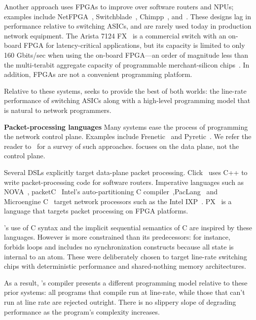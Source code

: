 Another approach uses FPGAs to improve over software routers and NPUs; examples
include NetFPGA~\cite{netfpga}, Switchblade~\cite{switchblade}, Chimpp~\cite{chimpp},
and~\cite{silver_bullet}. These designs lag in performance relative to switching
ASICs, and are rarely used today in production network equipment. The Arista
7124 FX~\cite{7124fx} is a commercial switch with an on-board FPGA for
latency-critical applications, but its capacity is limited to only 160
Gbits/sec when using the on-board FPGA---an order of magnitude less than the
multi-terabit aggregate capacity of programmable merchant-silicon
chips~\cite{xpliant}. In addition, FPGAs are not a convenient programming
platform.

Relative to these systems, \pktlanguage seeks to provide the best of both
worlds: the line-rate performance of switching ASICs along with a high-level
programming model that is natural to network programmers.

\textbf{Packet-processing languages}
Many systems ease the process of programming the network control plane.
Examples include Frenetic~\cite{frenetic} and Pyretic~\cite{pyretic}. We refer
the reader to~\cite{language_survey} for a survey of such approaches.
\pktlanguage focuses on the data plane, not the control plane.

Several DSLs explicitly target data-plane packet processing. Click~\cite{click} uses C++
to write packet-processing code for software routers. Imperative languages such
as NOVA~\cite{nova}, packetC~\cite{packetc} Intel's auto-partitioning C
compiler~\cite{intel_uiuc_pldi},PacLang~\cite{paclang_lang,
paclang_partitioner} and Microengine C~\cite{microenginec, intel_ixa} target
network processors such as the Intel IXP~\cite{ixp2800, ixp4xx}.  PX~\cite{PX}
is a language that targets packet processing on FPGA platforms.

\pktlanguage's use of C syntax and the implicit sequential semantics of C are
inspired by these languages. However \pktlanguage is more constrained than its
predecessors: for instance, \pktlanguage forbids loops and includes no
synchronization constructs because all state is internal to an atom. These were
deliberately chosen to target line-rate switching chips with deterministic
performance and shared-nothing memory architectures.

As a result, \pktlanguage's compiler presents a different programming model
relative to these prior systems: all \pktlanguage programs that compile run at
line-rate, while those that can't run at line rate are rejected outright. There
is no slippery slope of degrading performance as the program's complexity
increases.

